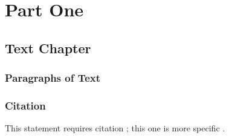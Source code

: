 \documentclass[11pt,fleqn]{book} %
\begin{document}



\pagestyle{empty} %

\tableofcontents %

\cleardoublepage %

\pagestyle{fancy} %


\part{Part One}



\chapter{Text Chapter}

\section{Paragraphs of Text}

\lipsum[1-7] %


\section{Citation}

This statement requires citation \cite{book_key}; this one is more specific \cite[122]{article_key}.
\end{document}
